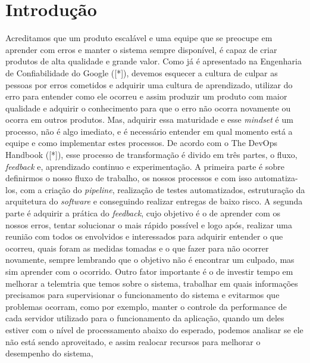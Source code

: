 \chapter{Introdução}

  Acreditamos que um produto escalável e uma equipe que se preocupe em aprender
  com erros e manter o sistema sempre disponível, é capaz de criar produtos de
  alta qualidade e grande valor. \newline
  Como já é apresentado na Engenharia de Confiabilidade do Google ([*]), devemos
  esquecer a cultura de culpar as pessoas por erros cometidos e adquirir uma
  cultura de aprendizado, utilizar do erro para entender como ele ocorreu e assim
  produzir um produto com maior qualidade e adquirir o conhecimento para que o
  erro não ocorra novamente ou ocorra em outros produtos. Mas, adquirir essa
  maturidade e esse \textit{mindset} é um processo, não é algo imediato, e é
  necessário entender em qual momento está a equipe e como implementar estes
  processos. \newline
  De acordo com o The DevOps Handbook ([*]), esse processo de transformação é
  divido em três partes, o fluxo, \textit{feedback} e, aprendizado continuo e
  experimentação. A primeira parte é sobre definirmos o nosso fluxo de trabalho,
  os nossos processos e com isso automatiza-los, com a criação do \textit{pipeline},
  realização de testes automatizados, estruturação da arquitetura do \textit{software}
  e conseguindo realizar entregas de baixo risco. A segunda parte é adquirir a
  prática do \textit{feedback}, cujo objetivo é o de aprender com os nossos erros,
  tentar solucionar o mais rápido possível e logo após, realizar uma reunião com
  todos os envolvidos e interessados para adquirir entender o que ocorreu, quais
  foram as medidas tomadas e o que fazer para não ocorrer novamente, sempre
  lembrando que o objetivo não é encontrar um culpado, mas sim aprender com o
  ocorrido. Outro fator importante é o de investir tempo em melhorar a telemtria
  que temos sobre o sistema, trabalhar em quais informações precisamos para
  supervisionar o funcionamento do sistema e evitarmos que problemas ocorram,
  como por exemplo, manter o controle da performance de cada servidor utilizado
  para o funcionamento da aplicação, quando um deles estiver com o nível de
  processamento abaixo do esperado, podemos analisar se ele não está sendo
  aproveitado, e assim realocar recursos para melhorar o desempenho do sistema,
